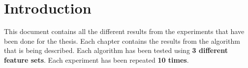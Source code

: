 
\chapter{Introduction} %

This document contains all the different results from the experiments that have been done for the thesis. Each chapter contains the results from the algorithm that is being described. Each algorithm has been tested using \textbf{3 different feature sets}. Each experiment has been repeated \textbf{10 times}. 